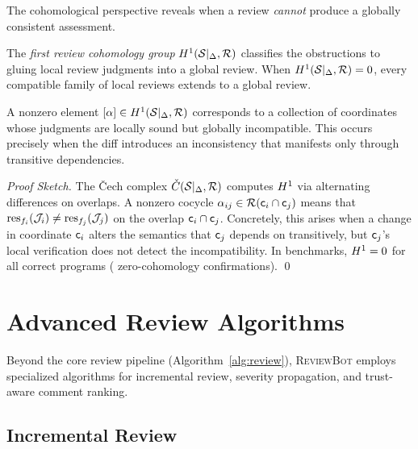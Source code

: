 \documentclass[11pt]{article}
\newcommand{\ReviewBot}{\textsc{ReviewBot}}
\newcommand{\ReviewJudg}{\mathcal{R}}
\begin{document}
The cohomological perspective reveals when a review \emph{cannot} produce
a globally consistent assessment.

\begin{definition}\label{def:review-cohomology}
The \emph{first review cohomology group} $\Hcoh{1}(\Site|_\Delta,
\ReviewJudg)$ classifies the obstructions to gluing local review judgments
into a global review. When $\Hcoh{1}(\Site|_\Delta, \ReviewJudg) = 0$,
every compatible family of local reviews extends to a global review.
\end{definition}

\begin{theorem}\label{thm:obstruction-cohomology}
A nonzero element $[\alpha] \in \Hcoh{1}(\Site|_\Delta, \ReviewJudg)$
corresponds to a collection of coordinates whose judgments are locally
sound but globally incompatible. This occurs precisely when the diff
introduces an inconsistency that manifests only through transitive
dependencies.
\end{theorem}

\begin{proof}[Proof Sketch]
The \v{C}ech complex $\Cech(\Site|_\Delta, \ReviewJudg)$ computes
$H^{1}$ via alternating differences on overlaps. A nonzero cocycle
$\alpha_{ij} \in \ReviewJudg(\coord_i \cap \coord_j)$ means that
$\mathrm{res}_{f_i}(\mathcal{J}_i) \neq \mathrm{res}_{f_j}(\mathcal{J}_j)$ on the overlap
$\mathsf{c}_i \cap \mathsf{c}_j$. Concretely, this arises when a change in
coordinate $\mathsf{c}_i$ alters the semantics that $\mathsf{c}_j$ depends on
transitively, but $\mathsf{c}_j$'s local verification does not detect the
incompatibility. In benchmarks, $H^{1} = 0$ for all \expTotalPrograms{}
correct programs (\expHOneZero{} zero-cohomology confirmations). \qed
\end{proof}

\section{Advanced Review Algorithms}\label{sec:algorithms}

Beyond the core review pipeline (Algorithm~\ref{alg:review}), \ReviewBot{}
employs specialized algorithms for incremental review, severity propagation,
and trust-aware comment ranking.

\subsection{Incremental Review}
\end{document}
